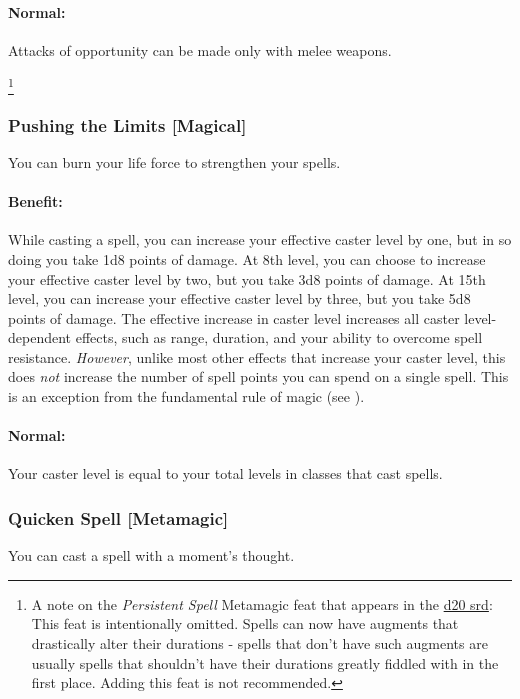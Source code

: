 \paragraph{Normal:} Attacks of opportunity can be made only with melee weapons.

\footnote{A note on the \emph{Persistent Spell} Metamagic feat that appears in the \href{http://www.wizards.com/default.asp?x=d20/article/srd35}{d20 srd}:
This feat is intentionally omitted. Spells can now have augments that drastically alter their durations - spells that don't have such augments
are usually spells that shouldn't have their durations greatly fiddled with in the first place. Adding this feat is not recommended.}
\subsubsection[Pushing the Limits]{Pushing the Limits [Magical]}
\label{Feat:PushingTheLimits}
You can burn your life force to strengthen your spells.

\paragraph{Benefit:} While casting a spell, you can increase your effective caster level by one, but in so doing you take 1d8 points of damage. 
At 8th level, you can choose to increase your effective caster level by two, but you take 3d8 points of damage. 
At 15th level, you can increase your effective caster level by three, but you take 5d8 points of damage.
The effective increase in caster level increases all caster level-dependent effects, such as range, duration, and 
your ability to overcome spell resistance. \emph{However}, unlike most other effects that increase your caster level, this does \emph{not}
increase the number of spell points you can spend on a single spell. 
This is an exception from the fundamental rule of magic (see ).

\paragraph{Normal:} Your caster level is equal to your total levels in classes that cast spells.

\subsubsection[Quicken Spell]{Quicken Spell [Metamagic]}
\label{Feat:QuickenSpell}
You can cast a spell with a moment's thought.

